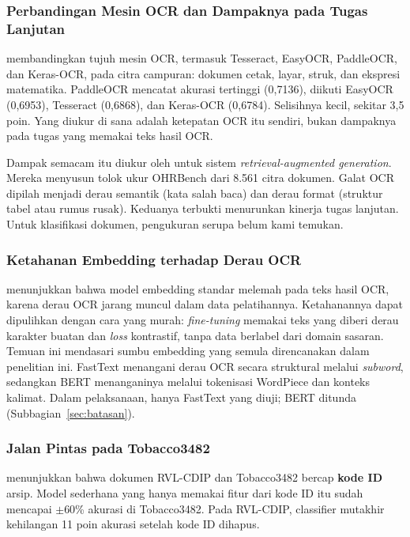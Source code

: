 \subsubsection{Perbandingan Mesin OCR dan Dampaknya pada Tugas Lanjutan}

\textcite{francis2025} membandingkan tujuh mesin OCR, termasuk Tesseract, EasyOCR,
PaddleOCR, dan Keras-OCR, pada citra campuran: dokumen cetak, layar, struk, dan ekspresi
matematika. PaddleOCR mencatat akurasi tertinggi (0,7136), diikuti EasyOCR (0,6953),
Tesseract (0,6868), dan Keras-OCR (0,6784). Selisihnya kecil, sekitar 3,5 poin. Yang
diukur di sana adalah ketepatan OCR itu sendiri, bukan dampaknya pada tugas yang
memakai teks hasil OCR.

Dampak semacam itu diukur oleh \textcite{zhang2025} untuk sistem
\textit{retrieval-augmented generation}. Mereka menyusun tolok ukur OHRBench dari 8.561
citra dokumen. Galat OCR dipilah menjadi derau semantik (kata salah baca) dan derau
format (struktur tabel atau rumus rusak). Keduanya terbukti menurunkan kinerja tugas
lanjutan. Untuk klasifikasi dokumen, pengukuran serupa belum kami temukan.

\subsubsection{Ketahanan Embedding terhadap Derau OCR}

\textcite{michail2025} menunjukkan bahwa model embedding standar melemah pada teks hasil
OCR, karena derau OCR jarang muncul dalam data pelatihannya. Ketahanannya dapat
dipulihkan dengan cara yang murah: \textit{fine-tuning} memakai teks yang diberi derau
karakter buatan dan \textit{loss} kontrastif, tanpa data berlabel dari domain sasaran.
Temuan ini mendasari sumbu embedding yang semula direncanakan dalam penelitian ini.
FastText menangani derau OCR secara struktural melalui \textit{subword}, sedangkan BERT
menanganinya melalui tokenisasi WordPiece dan konteks kalimat. Dalam pelaksanaan, hanya
FastText yang diuji; BERT ditunda (Subbagian~\ref{sec:batasan}).

\subsubsection{Jalan Pintas pada Tobacco3482}

\textcite{larson2025} menunjukkan bahwa dokumen RVL-CDIP dan Tobacco3482 bercap
\textbf{kode ID} arsip. Model sederhana yang hanya memakai fitur dari kode ID itu sudah
mencapai $\pm$60\% akurasi di Tobacco3482. Pada RVL-CDIP, classifier mutakhir kehilangan
11 poin akurasi setelah kode ID dihapus.

